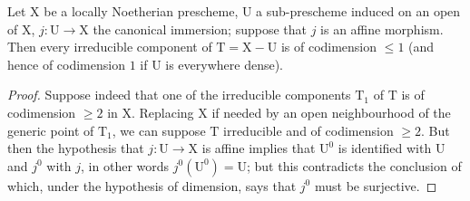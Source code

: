 \begin{corollary}[21.12.7]
\label{IV.21.12.7}
Let $\mathrm{X}$ be a locally Noetherian prescheme, $\mathrm{U}$ a sub-prescheme induced on an open of $\mathrm{X}$, $j:\mathrm{U}\to\mathrm{X}$ the canonical immersion; suppose that $j$ is an affine morphism.
Then every irreducible component of $\mathrm{T}=\mathrm{X}-\mathrm{U}$ is of codimension $\leq 1$ (and hence of codimension $1$ if $\mathrm{U}$ is everywhere dense).
\end{corollary}

\begin{proof}
Suppose indeed that one of the irreducible components $\mathrm{T}_1$ of $\mathrm{T}$ is of codimension $\geq 2$ in $\mathrm{X}$.
Replacing $\mathrm{X}$ if needed by an open neighbourhood of the generic point of $\mathrm{T}_1$, we can suppose $\mathrm{T}$ irreducible and of codimension $\geq 2$.
But then the hypothesis
that $j:\mathrm{U}\to\mathrm{X}$ is affine implies that $\mathrm{U}^0$ is identified with $\mathrm{U}$ and $j^0$ with $j$, in other words $j^0(\mathrm{U}^0)=\mathrm{U}$; but this contradicts the conclusion of  which, under the hypothesis of dimension, says that $j^0$ must be surjective.
\end{proof}

